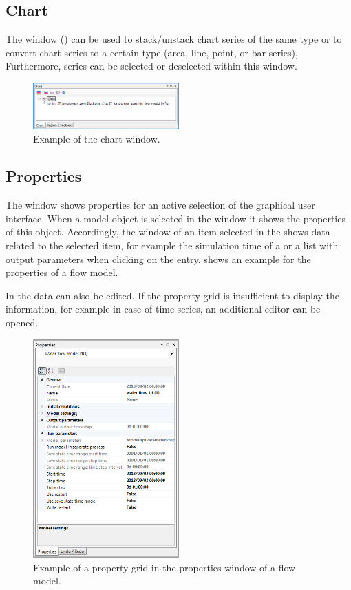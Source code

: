 \subsection{Chart}
\label{subsec:chart}
The  window () can be used to stack/unstack chart series of the same type or to convert chart series to a certain type (area, line, point, or bar series), Furthermore, series can be selected or deselected within this window.
 
\begin{figure} [H]
	\centering
		\includegraphics[width=0.5\textwidth]{figures/chapter_overview/view_chart_window.png}
	\caption{Example of the chart window.}
	\label{fig:chartwindow}
\end{figure}
%
\subsection{Properties}
\label{subsec:properties}
%
The  window shows properties for an active selection of the graphical user interface. When a model object is selected in the  window it shows the properties of this object. Accordingly, the  window of an item selected in the  shows data related to the selected item, for example the simulation time of a  or a list with output parameters when clicking on the  entry.  shows an example for the properties of a flow model.

In the  data can also be edited. If the property grid is insufficient to display the information, for example in case of time series, an additional editor can be opened.
%
\begin{figure} [H]
	\centering
		\includegraphics[width=0.5\textwidth]{figures/chapter_overview/view_properties_window.png}
	\caption{Example of a property grid in the properties window of a flow model.}
	\label{fig:fig2.6}
\end{figure}
%
